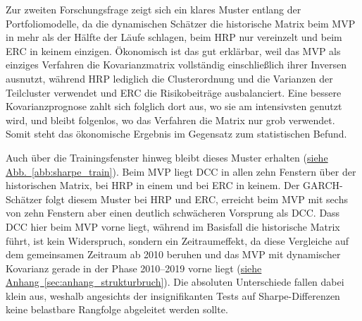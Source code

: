 \documentclass[12pt,a4paper]{article}
\begin{document}
Zur zweiten Forschungsfrage zeigt sich ein klares Muster entlang der Portfoliomodelle, da die dynamischen Schätzer die historische Matrix beim MVP in mehr als der Hälfte der Läufe schlagen, beim HRP nur vereinzelt und beim ERC in keinem einzigen.
Ökonomisch ist das gut erklärbar, weil das MVP als einziges Verfahren die Kovarianzmatrix vollständig einschließlich ihrer Inversen ausnutzt, während HRP lediglich die Clusterordnung und die Varianzen der Teilcluster verwendet und ERC die Risikobeiträge ausbalanciert.
Eine bessere Kovarianzprognose zahlt sich folglich dort aus, wo sie am intensivsten genutzt wird, und bleibt folgenlos, wo das Verfahren die Matrix nur grob verwendet.
Somit steht das ökonomische Ergebnis im Gegensatz zum statistischen Befund.



Auch über die Trainingsfenster hinweg bleibt dieses Muster erhalten (\hyperref[abb:sharpe_train]{siehe Abb.~\ref*{abb:sharpe_train}}).
Beim MVP liegt DCC in allen zehn Fenstern über der historischen Matrix, bei HRP in einem und bei ERC in keinem.
Der GARCH-Schätzer folgt diesem Muster bei HRP und ERC, erreicht beim MVP mit sechs von zehn Fenstern aber einen deutlich schwächeren Vorsprung als DCC.
Dass DCC hier beim MVP vorne liegt, während im Basisfall die historische Matrix führt, ist kein Widerspruch, sondern ein Zeitraumeffekt, da diese Vergleiche auf dem gemeinsamen Zeitraum ab 2010 beruhen und das MVP mit dynamischer Kovarianz gerade in der Phase 2010--2019 vorne liegt (\hyperref[sec:anhang_strukturbruch]{siehe Anhang~\ref*{sec:anhang_strukturbruch}}).
Die absoluten Unterschiede fallen dabei klein aus, weshalb angesichts der insignifikanten Tests auf Sharpe-Differenzen keine belastbare Rangfolge abgeleitet werden sollte.

%


\end{document}
